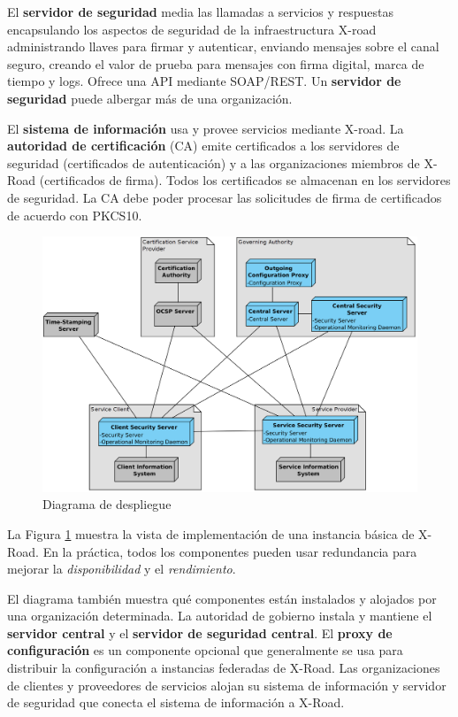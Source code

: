 El \textbf{servidor de seguridad} media las llamadas a servicios y respuestas encapsulando los aspectos de seguridad de la infraestructura X-road administrando llaves para firmar y autenticar, enviando mensajes sobre el canal seguro, creando el valor de prueba para mensajes con firma digital, marca de tiempo y logs. Ofrece una API mediante SOAP/REST. 
Un \textbf{servidor de seguridad}  puede albergar más de una organización. 

El \textbf{sistema de información} usa y provee servicios mediante X-road. La \textbf{autoridad de certificación} (CA) emite certificados a los servidores de seguridad (certificados de autenticación) y a las organizaciones miembros de X-Road (certificados de firma). Todos los certificados se almacenan en los servidores de seguridad. La CA debe poder procesar las solicitudes de firma de certificados de acuerdo con PKCS10.


\begin{figure}[h!]
    \centering
    \includegraphics[scale=0.7]{Pictures/arc-g_deployment_view_of_x_road.png}
    \caption{Diagrama de despliegue}
    \label{fig:DD}
\end{figure}

La Figura \ref{fig:DD} muestra la vista de implementación de una instancia básica de X-Road. En la práctica, todos los componentes pueden usar redundancia para mejorar la \textit{disponibilidad} y el \textit{rendimiento}. 

El diagrama también muestra qué componentes están instalados y alojados por una organización determinada. La autoridad de gobierno instala y mantiene el \textbf{servidor central} y el \textbf{servidor de seguridad central}. El \textbf{proxy de configuración} es un componente opcional que generalmente se usa para distribuir la configuración a instancias federadas de X-Road. Las organizaciones de clientes y proveedores de servicios alojan su sistema de información y servidor de seguridad que conecta el sistema de información a X-Road.


